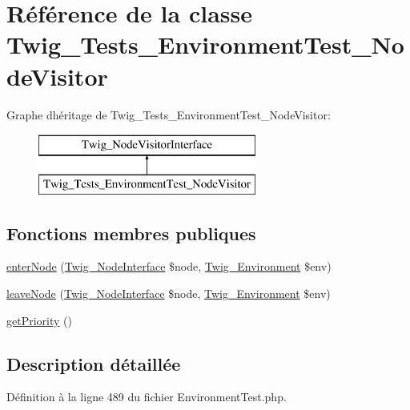 \hypertarget{class_twig___tests___environment_test___node_visitor}{}\section{Référence de la classe Twig\+\_\+\+Tests\+\_\+\+Environment\+Test\+\_\+\+Node\+Visitor}
\label{class_twig___tests___environment_test___node_visitor}
Graphe d\textquotesingle{}héritage de Twig\+\_\+\+Tests\+\_\+\+Environment\+Test\+\_\+\+Node\+Visitor\+:\begin{figure}[H]
\begin{center}
\leavevmode
\includegraphics[height=2.000000cm]{class_twig___tests___environment_test___node_visitor}
\end{center}
\end{figure}
\subsection*{Fonctions membres publiques}
\begin{DoxyCompactItemize}
\item 
\hyperlink{class_twig___tests___environment_test___node_visitor_ad3bfee38f2bc56df9500da7f20b6e13a}{enter\+Node} (\hyperlink{interface_twig___node_interface}{Twig\+\_\+\+Node\+Interface} \$node, \hyperlink{class_twig___environment}{Twig\+\_\+\+Environment} \$env)
\item 
\hyperlink{class_twig___tests___environment_test___node_visitor_a436bb1ae16511148e860e5cfa2cad88f}{leave\+Node} (\hyperlink{interface_twig___node_interface}{Twig\+\_\+\+Node\+Interface} \$node, \hyperlink{class_twig___environment}{Twig\+\_\+\+Environment} \$env)
\item 
\hyperlink{class_twig___tests___environment_test___node_visitor_a1e7a3c168dcd0901a0d2669c67575b55}{get\+Priority} ()
\end{DoxyCompactItemize}


\subsection{Description détaillée}


Définition à la ligne 489 du fichier Environment\+Test.\+php.



